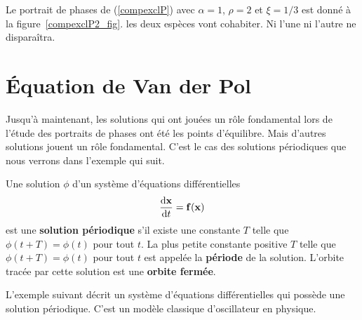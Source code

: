 {\begin{egg}
Le portrait de phases de (\ref{compexclP}) avec $\alpha =1$, $\rho=2$
et $\xi = 1/3$ est donné à la figure~\ref{compexclP2_fig}.  les deux
espèces vont cohabiter.  Ni l'une ni l'autre ne disparaîtra.

\label{COMPEXCL2}
\end{egg}


\section{\'Equation de Van der Pol}

Jusqu'à maintenant, les solutions qui ont jouées un rôle fondamental
lors de l'étude des portraits de phases ont été les points
d'équilibre.  Mais d'autres solutions jouent un rôle fondamental.
C'est le cas des solutions périodiques que nous verrons dans l'exemple
qui suit.

\begin{focus}{\dfn}
Une solution $\phi$ d'un système d'équations différentielles
\[
\frac{\mathrm{d}\mathbf{x}}{\mathrm{d}t} = \mathbf{f}(\mathbf{x})
\]
est une {\bfseries solution périodique} s'il existe une constante $T$ telle
que $\phi(t+T)=\phi(t)$ pour tout $t$.  La plus petite constante positive $T$
telle que $\phi(t+T)=\phi(t)$ pour tout $t$ est appelée la
{\bfseries période}
de la solution.  L'orbite tracée par cette solution est
une {\bfseries orbite fermée}.
\end{focus}

\begin{egg}
L'exemple suivant décrit un système d'équations différentielles qui possède
une solution périodique.  C'est un modèle classique d'oscillateur en
physique.


\end{egg}}
